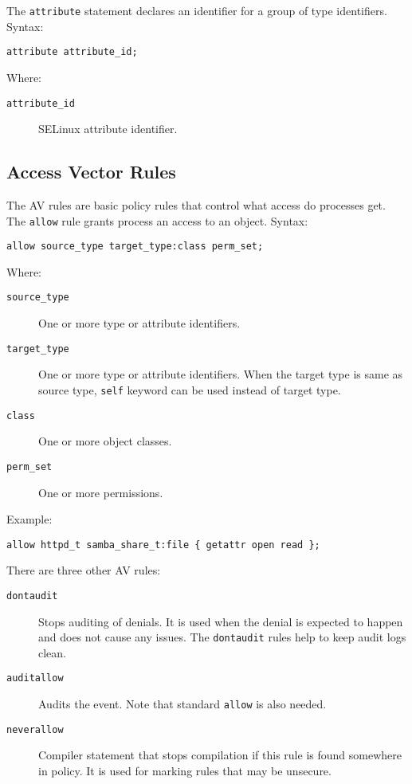 The \texttt{attribute} statement declares an identifier for a group of type
identifiers. Syntax:
\begin{lstlisting}
attribute attribute_id;
\end{lstlisting}
Where:
\begin{description}
    \item [\texttt{attribute\_id}] SELinux attribute identifier.
\end{description}



\subsection{Access Vector Rules}

The AV rules are basic policy rules that control what access do processes get.
The \texttt{allow} rule grants process an access to an object. Syntax:
\begin{lstlisting}
allow source_type target_type:class perm_set;
\end{lstlisting}
Where:
\begin{description}
    \item [\texttt{source\_type}] One or more type or attribute identifiers.
    \item [\texttt{target\_type}] One or more type or attribute identifiers.
        When the target type is same as source type, \texttt{self} keyword can
        be used instead of target type.
    \item [\texttt{class}] One or more object classes.
    \item [\texttt{perm\_set}] One or more permissions.
\end{description}
Example:
\begin{lstlisting}
allow httpd_t samba_share_t:file { getattr open read };
\end{lstlisting}

There are three other AV rules:
\begin{description}
    \item [\texttt{dontaudit}] Stops auditing of denials. It is used when the
        denial is expected to happen and does not cause any issues. The
        \texttt{dontaudit} rules help to keep audit logs clean.
    \item [\texttt{auditallow}] Audits the event. Note that standard
        \texttt{allow} is also needed.
    \item [\texttt{neverallow}] Compiler statement that stops compilation if
        this rule is found somewhere in policy. It is used for marking rules
        that may be unsecure.
\end{description}

